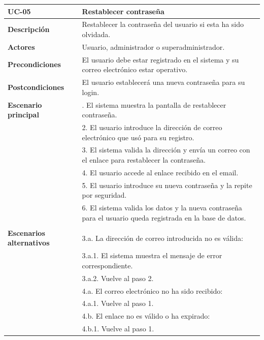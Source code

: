 \begin{table}
  \begin{center}
    \begin{tabularx}{16.4cm}{|l|X|}
      \hline
      \textbf{UC-05} & \textbf{Restablecer contraseña}\\
      \hline
      \textbf{Descripción} & Restablecer la contraseña del usuario si esta ha sido olvidada.\\
      \hline
      \textbf{Actores} & Usuario, administrador o superadministrador.\\
      \hline
      \textbf{Precondiciones} & El usuario debe estar registrado en el sistema y su correo electrónico estar operativo.\\
      \hline
      \textbf{Postcondiciones} & El usuario establecerá una nueva contraseña para su login.\\
      \hline
      \textbf{Escenario principal} & \smallskip 1. El sistema muestra la pantalla de restablecer contraseña. \\
      & 2. El usuario introduce la dirección de correo electrónico que usó para su registro.\\
      & 3. El sistema valida la dirección y envía un correo con el enlace para restablecer la contraseña.\\
      & 4. El usuario accede al enlace recibido en el email.\\
      & 5. El usuario introduce su nueva contraseña y la repite por seguridad.\\
      & 6. El sistema valida los datos y la nueva contraseña para el usuario queda registrada en la base de datos.\\
      & \\
      \hline
      \textbf{Escenarios alternativos} & \smallskip  3.a. La dirección de correo introducida no es válida:\\
      & \hspace{0.3cm} 3.a.1. El sistema muestra el mensaje de error correspondiente.\\
      & \hspace{0.3cm} 3.a.2. Vuelve al paso 2.\\
      & 4.a. El correo electrónico no ha sido recibido:\\
      & \hspace{0.3cm} 4.a.1. Vuelve al paso 1.\\
      & 4.b. El enlace no es válido o ha expirado:\\
      & \hspace{0.3cm} 4.b.1. Vuelve al paso 1.\\

\end{tabularx}
\end{center}
\end{table}
